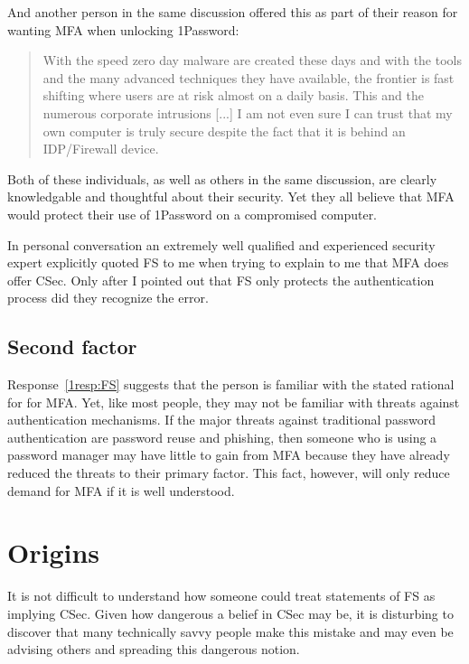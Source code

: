 \documentclass{soups}
\newcommand{\prop}[1]{\textsf{#1}}
\begin{document}
And another person in the same discussion offered this as part of their reason
for wanting MFA when unlocking 1Password:

\begin{quotation}
  With the speed zero day malware are created these days and with the tools and the many advanced techniques they have available, the frontier is fast shifting where users are at risk almost on a daily basis. This and the numerous corporate intrusions [...] I am not even sure I can trust that my own computer is truly secure despite the fact that it is behind an IDP/Firewall device.
\end{quotation}

Both of these individuals, as well as others in the same discussion,
are clearly knowledgable and thoughtful about their security.
Yet they all believe that MFA would protect their use of 1Password on a compromised computer.

In personal conversation an extremely well qualified and experienced security expert explicitly quoted \prop{FS} to me when trying to explain to me that MFA does offer \prop{CSec}. Only after I pointed out that  \prop{FS} only protects the authentication process did they recognize the error.

\subsection{Second factor}

Response~\ref{1resp:FS} suggests that the person is familiar with the stated rational for for MFA\@.
Yet, like most people, they may not be familiar with threats against authentication mechanisms.
If the major threats against traditional password authentication are password reuse and phishing,
then someone who is using a password manager may have little to gain from
MFA because they have already reduced the threats to their primary factor.
This fact, however, will only reduce demand for MFA if it is well understood.

\section{Origins}

It is not difficult to understand how someone could treat statements of  \prop{FS} as implying  \prop{CSec}.
Given how dangerous a belief in \prop{CSec} may be, it is disturbing to discover that
many technically savvy people make this mistake and may even be advising others and spreading this dangerous notion.
\end{document}
